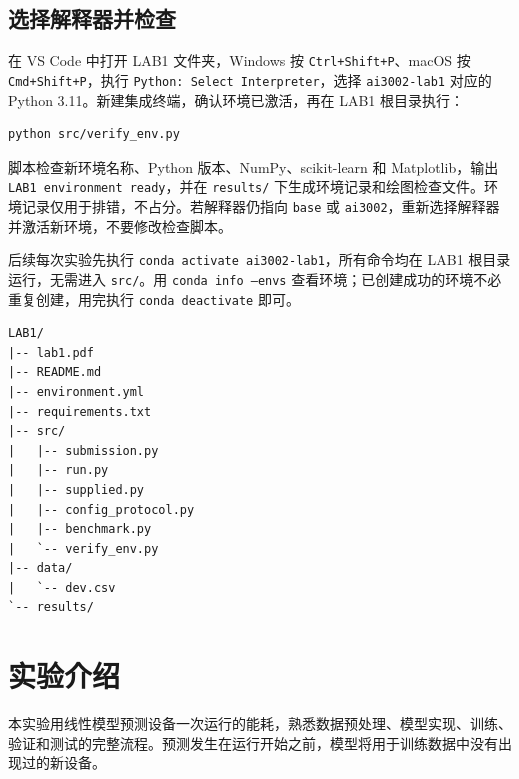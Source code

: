 \documentclass[11pt,a4paper]{article}
\newcommand{\code}[1]{{\small\nolinkurl{#1}}}
\begin{document}
\subsection*{选择解释器并检查}
在 VS Code 中打开 LAB1 文件夹，Windows 按 \code{Ctrl+Shift+P}、macOS 按 \code{Cmd+Shift+P}，执行 {\small\texttt{Python: Select Interpreter}}，选择 \code{ai3002-lab1} 对应的 Python 3.11。新建集成终端，确认环境已激活，再在 LAB1 根目录执行：


\par{}\noindent\begin{minipage}{\linewidth}
\begin{lstlisting}[aboveskip=0pt,belowskip=0pt]
python src/verify_env.py
\end{lstlisting}
\end{minipage}\par{}
脚本检查新环境名称、Python 版本、NumPy、scikit-learn 和 Matplotlib，输出 {\small\texttt{LAB1 environment ready}}，并在 \code{results/} 下生成环境记录和绘图检查文件。环境记录仅用于排错，不占分。若解释器仍指向 \code{base} 或 \code{ai3002}，重新选择解释器并激活新环境，不要修改检查脚本。

后续每次实验先执行 {\small\texttt{conda activate ai3002-lab1}}，所有命令均在 LAB1 根目录运行，无需进入 \code{src/}。用 {\small\texttt{conda info --envs}} 查看环境；已创建成功的环境不必重复创建，用完执行 {\small\texttt{conda deactivate}} 即可。


\par{}\noindent\begin{minipage}{\linewidth}
\begin{lstlisting}[aboveskip=0pt,belowskip=0pt]
LAB1/
|-- lab1.pdf
|-- README.md
|-- environment.yml
|-- requirements.txt
|-- src/
|   |-- submission.py
|   |-- run.py
|   |-- supplied.py
|   |-- config_protocol.py
|   |-- benchmark.py
|   `-- verify_env.py
|-- data/
|   `-- dev.csv
`-- results/
\end{lstlisting}
\end{minipage}\par{}

\section{实验介绍}
本实验用线性模型预测设备一次运行的能耗，熟悉数据预处理、模型实现、训练、验证和测试的完整流程。预测发生在运行开始之前，模型将用于训练数据中没有出现过的新设备。
\end{document}
